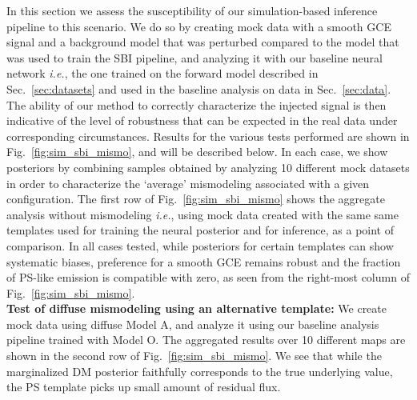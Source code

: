 \documentclass[prd,aps,10pt,nofootinbib,twocolumn,superscriptaddress,preprintnumbers,balancelastpage,longbibliography]{revtex4-1}
\begin{document}
In this section we assess the susceptibility of our simulation-based inference pipeline to this scenario. We do so by creating mock data with a smooth GCE signal and a background model that was perturbed compared to the model that was used to train the SBI pipeline, and analyzing it with our baseline neural network \emph{i.e.}, the one trained on the forward model described in Sec.~\ref{sec:datasets} and used in the baseline analysis on data in Sec.~\ref{sec:data}. The ability of our method to correctly characterize the injected signal is then indicative of the level of robustness that can be expected in the real data under corresponding circumstances. Results for the various tests performed are shown in Fig.~\ref{fig:sim_sbi_mismo}, and will be described below. In each case, we show posteriors by combining samples obtained by analyzing 10 different mock datasets in order to characterize the `average' mismodeling associated with a given configuration. The first row of Fig.~\ref{fig:sim_sbi_mismo} shows the aggregate analysis without mismodeling \emph{i.e.}, using mock data created with the same same templates used for training the neural posterior and for inference, as a point of comparison. In all cases tested, while posteriors for certain templates can show systematic biases, preference for a smooth GCE remains robust and the fraction of PS-like emission is compatible with zero, as seen from the right-most column of Fig.~\ref{fig:sim_sbi_mismo}. \\

\noindent
\textbf{Test of diffuse mismodeling using an alternative template:}
We create mock data using diffuse Model A, and analyze it using our baseline analysis pipeline trained with Model O. The aggregated results over 10 different maps are shown in the second row of Fig.~\ref{fig:sim_sbi_mismo}. We see that while the marginalized DM posterior faithfully corresponds to the true underlying value, the PS template picks up small amount of residual flux. \\
\end{document}
